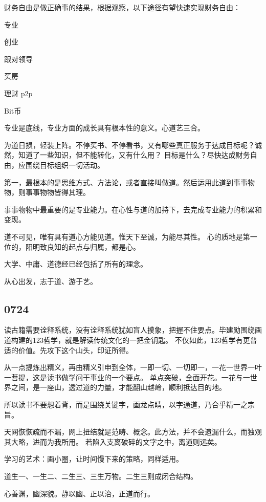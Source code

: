 财务自由是做正确事的结果，根据观察，以下途径有望快速实现财务自由：
\begin{enumbox}
\item 专业
\item 创业
\item 跟对领导
\item 买房
\item 理财 p2p
\item Bit币
\end{enumbox}

专业是底线，专业方面的成长具有根本性的意义。心道艺三合。

为道日损，轻装上阵。不停买书、不停看书，又有哪些真正服务于达成目标呢？诚然，知道了一些知识，但不能转化，又有什么用？
目标是什么？尽快达成财务自由，应围绕目标组织一切活动。

第一，最根本的是思维方式、方法论，或者直接叫做道。然后运用此道到事事物物，则事事物物皆得其理。

事事物物中最重要的是专业能力。在心性与道的加持下，去完成专业能力的积累和变现。

道不可见，唯有具有道心方能见道。惟天下至诚，为能尽其性。
心的质地是第一位的，阳明致良知的起点与归属，都是心。

大学、中庸、道德经已经包括了所有的理念。

从心出发，志于道、游于艺。

\subsection{0724}

读古籍需要诠释系统，没有诠释系统犹如盲人摸象，把握不住要点。毕建勋围绕画道构建的123哲学，就是解读传统文化的一把金钥匙。
不仅如此，123哲学有更普适的价值。先攻下这个山头，印证所得。

从一点提炼出精义，再由精义引申到全体，一即一切、一切即一，一花一世界一叶一菩提，这是读书做学问干事业的一个要点。
单点突破，全面开花。一花与一世界之间，是一座山，透过道的力量，才能翻山越岭，顺利抵达目的地。

所以读书不要想着背，而是围绕关键字，画龙点睛，以字通道，乃合乎精一之宗旨。

天网恢恢疏而不漏，网上扭结就是范畴、概念。此方法，并不会遗漏什么，而独观其大略，进而为我所用。
若陷入支离破碎的文字之中，离道则远矣。

学习的艺术：画小圈，让时间慢下来的策略，同样适用。

道生一、一生二、二生三、三生万物。二生三则成闭合结构。

心善渊，幽深貌。静以幽、正以治，正道而行。

